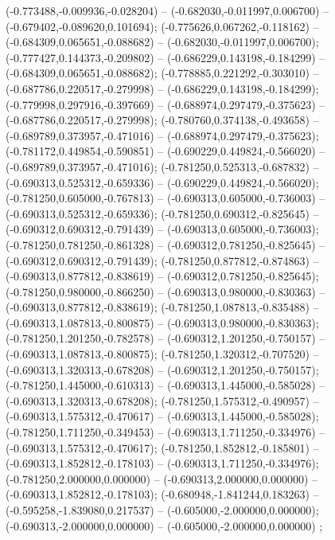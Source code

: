  (-0.773488,-0.009936,-0.028204) -- (-0.682030,-0.011997,0.006700) -- (-0.679402,-0.089620,0.101694);
 (-0.775626,0.067262,-0.118162) -- (-0.684309,0.065651,-0.088682) -- (-0.682030,-0.011997,0.006700);
 (-0.777427,0.144373,-0.209802) -- (-0.686229,0.143198,-0.184299) -- (-0.684309,0.065651,-0.088682);
 (-0.778885,0.221292,-0.303010) -- (-0.687786,0.220517,-0.279998) -- (-0.686229,0.143198,-0.184299);
 (-0.779998,0.297916,-0.397669) -- (-0.688974,0.297479,-0.375623) -- (-0.687786,0.220517,-0.279998);
 (-0.780760,0.374138,-0.493658) -- (-0.689789,0.373957,-0.471016) -- (-0.688974,0.297479,-0.375623);
 (-0.781172,0.449854,-0.590851) -- (-0.690229,0.449824,-0.566020) -- (-0.689789,0.373957,-0.471016);
 (-0.781250,0.525313,-0.687832) -- (-0.690313,0.525312,-0.659336) -- (-0.690229,0.449824,-0.566020);
 (-0.781250,0.605000,-0.767813) -- (-0.690313,0.605000,-0.736003) -- (-0.690313,0.525312,-0.659336);
 (-0.781250,0.690312,-0.825645) -- (-0.690312,0.690312,-0.791439) -- (-0.690313,0.605000,-0.736003);
 (-0.781250,0.781250,-0.861328) -- (-0.690312,0.781250,-0.825645) -- (-0.690312,0.690312,-0.791439);
 (-0.781250,0.877812,-0.874863) -- (-0.690313,0.877812,-0.838619) -- (-0.690312,0.781250,-0.825645);
 (-0.781250,0.980000,-0.866250) -- (-0.690313,0.980000,-0.830363) -- (-0.690313,0.877812,-0.838619);
 (-0.781250,1.087813,-0.835488) -- (-0.690313,1.087813,-0.800875) -- (-0.690313,0.980000,-0.830363);
 (-0.781250,1.201250,-0.782578) -- (-0.690312,1.201250,-0.750157) -- (-0.690313,1.087813,-0.800875);
 (-0.781250,1.320312,-0.707520) -- (-0.690313,1.320313,-0.678208) -- (-0.690312,1.201250,-0.750157);
 (-0.781250,1.445000,-0.610313) -- (-0.690313,1.445000,-0.585028) -- (-0.690313,1.320313,-0.678208);
 (-0.781250,1.575312,-0.490957) -- (-0.690313,1.575312,-0.470617) -- (-0.690313,1.445000,-0.585028);
 (-0.781250,1.711250,-0.349453) -- (-0.690313,1.711250,-0.334976) -- (-0.690313,1.575312,-0.470617);
 (-0.781250,1.852812,-0.185801) -- (-0.690313,1.852812,-0.178103) -- (-0.690313,1.711250,-0.334976);
 (-0.781250,2.000000,0.000000) -- (-0.690313,2.000000,0.000000) -- (-0.690313,1.852812,-0.178103);
 (-0.680948,-1.841244,0.183263) -- (-0.595258,-1.839080,0.217537) -- (-0.605000,-2.000000,0.000000);
 (-0.690313,-2.000000,0.000000) -- (-0.605000,-2.000000,0.000000) ;
